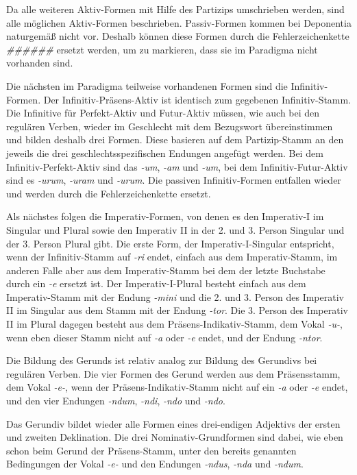 Da alle weiteren Aktiv-Formen mit Hilfe des Partizips umschrieben werden, sind alle möglichen Aktiv-Formen beschrieben. Passiv-Formen kommen bei Deponentia naturgemäß nicht vor. Deshalb können diese Formen durch die Fehlerzeichenkette \textit{\#\#\#\#\#\#} ersetzt werden, um zu markieren, dass sie im Paradigma nicht vorhanden sind. \par
Die nächsten im Paradigma teilweise vorhandenen Formen sind die Infinitiv-Formen. Der Infinitiv-Präsens-Aktiv ist identisch zum gegebenen Infinitiv-Stamm. Die Infinitive für Perfekt-Aktiv und Futur-Aktiv müssen, wie auch bei den regulären Verben, wieder im Geschlecht mit dem Bezugswort übereinstimmen und bilden deshalb drei Formen. Diese basieren auf dem Partizip-Stamm an den jeweils die drei geschlechtsspezifischen Endungen angefügt werden. Bei dem Infinitiv-Perfekt-Aktiv sind das \textit{-um}, \textit{-am} und \textit{-um}, bei dem Infinitiv-Futur-Aktiv sind es \textit{-urum}, \textit{-uram} und \textit{-urum}. Die passiven Infinitiv-Formen entfallen wieder und werden durch die Fehlerzeichenkette ersetzt. \par
Als nächstes folgen die Imperativ-Formen, von denen es den Imperativ-I im Singular und Plural sowie den Imperativ II in der 2. und 3. Person Singular und der 3. Person Plural gibt. Die erste Form, der Imperativ-I-Singular entspricht, wenn der Infinitiv-Stamm auf \textit{-ri} endet, einfach aus dem Imperativ-Stamm, im anderen Falle aber aus dem Imperativ-Stamm bei dem der letzte Buchstabe durch ein \textit{-e} ersetzt ist. Der Imperativ-I-Plural besteht einfach aus dem Imperativ-Stamm mit der Endung \textit{-mini} und die 2. und 3. Person des Imperativ II im Singular aus dem Stamm mit der Endung \textit{-tor}. Die 3. Person des Imperativ II im Plural dagegen besteht aus dem Präsens-Indikativ-Stamm, dem Vokal \textit{-u-}, wenn eben dieser Stamm nicht auf \textit{-a} oder \textit{-e} endet, und der Endung \textit{-ntor}. \par
Die Bildung des Gerunds ist relativ analog zur Bildung des Gerundivs bei regulären Verben. Die vier Formen des Gerund werden aus dem Präsensstamm, dem Vokal \textit{-e-}, wenn der Präsens-Indikativ-Stamm nicht auf ein \textit{-a} oder \textit{-e} endet, und den vier Endungen \textit{-ndum}, \textit{-ndi}, \textit{-ndo} und \textit{-ndo}. \par
Das Gerundiv bildet wieder alle Formen eines drei-endigen Adjektivs der ersten und zweiten Deklination. Die drei Nominativ-Grundformen sind dabei, wie eben schon beim Gerund der Präsens-Stamm, unter den bereits genannten Bedingungen der Vokal \textit{-e-} und den Endungen \textit{-ndus}, \textit{-nda} und \textit{-ndum}. \par
